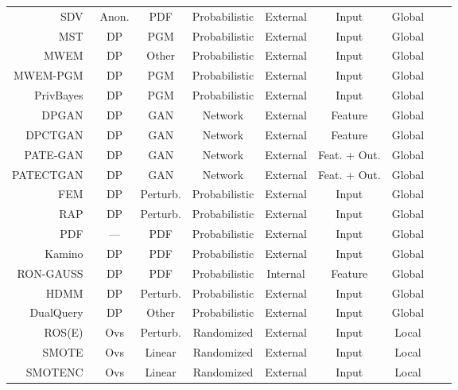 \documentclass[parskip=full]{scrartcl}
\begin{document}
\begin{longtable}{rcccccccc}
    \bottomrule
    \endlastfoot
    SDV~\cite{patki2016synthetic} & Anon. & PDF & Probabilistic & External & Input & Global \\
    MST~\cite{mckenna2021winning} & DP & PGM & Probabilistic & External & Input & Global \\
    MWEM~\cite{hardt2012simple} & DP & Other & Probabilistic & External & Input & Global \\
    MWEM-PGM~\cite{mckenna2019graphical} & DP & PGM & Probabilistic & External & Input & Global \\
    PrivBayes~\cite{zhang2017privbayes} & DP & PGM & Probabilistic & External & Input & Global \\
    DPGAN~\cite{xie2018differentially} & DP & GAN & Network & External & Feature & Global \\
    DPCTGAN~\cite{rosenblatt2020differentially} & DP & GAN &  Network & External & Feature & Global \\
    PATE-GAN~\cite{jordon2018pate} & DP & GAN & Network & External & Feat. + Out. & Global \\
    PATECTGAN~\cite{rosenblatt2020differentially} & DP & GAN & Network & External & Feat. + Out. & Global \\
    FEM~\cite{vietri2020new} & DP & Perturb. & Probabilistic & External & Input & Global \\
    RAP~\cite{aydore2021differentially} & DP & Perturb. & Probabilistic & External & Input & Global \\
    PDF~\cite{de2019formal, suciu2011probabilistic} & --- & PDF & Probabilistic & External & Input & Global \\
    Kamino~\cite{ge2021kamino} & DP & PDF & Probabilistic & External & Input & Global \\
    RON-GAUSS~\cite{chanyaswad2019ron} & DP & PDF & Probabilistic & Internal & Feature & Global \\
    HDMM~\cite{mckenna2018optimizing} & DP & Perturb. & Probabilistic & External & Input & Global \\
    DualQuery~\cite{gaboardi2014dual} & DP & Other & Probabilistic & External & Input & Global \\
    ROS(E)~\cite{menardi2014training} & Ovs & Perturb. & Randomized & External & Input & Local \\ 
    SMOTE~\cite{chawla2002smote} & Ovs & Linear & Randomized & External & Input & Local \\
    SMOTENC~\cite{chawla2002smote} & Ovs & Linear & Randomized & External & Input & Local \\

\end{longtable}
\end{document}

